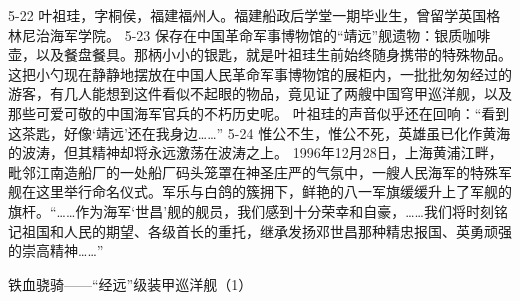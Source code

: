 \documentclass[12pt,UTF8]{ctexbook}
\begin{document}
5-22
叶祖珪，字桐侯，福建福州人。福建船政后学堂一期毕业生，曾留学英国格林尼治海军学院。
5-23
保存在中国革命军事博物馆的“靖远”舰遗物：银质咖啡壶，以及餐盘餐具。那柄小小的银匙，就是叶祖珪生前始终随身携带的特殊物品。
这把小勺现在静静地摆放在中国人民革命军事博物馆的展柜内，一批批匆匆经过的游客，有几人能想到这件看似不起眼的物品，竟见证了两艘中国穹甲巡洋舰，以及那些可爱可敬的中国海军官兵的不朽历史呢。
叶祖珪的声音似乎还在回响：“看到这茶匙，好像‘靖远’还在我身边……”
5-24
惟公不生，惟公不死，英雄虽已化作黄海的波涛，但其精神却将永远激荡在波涛之上。
1996年12月28日，上海黄浦江畔，毗邻江南造船厂的一处船厂码头笼罩在神圣庄严的气氛中，一艘人民海军的特殊军舰在这里举行命名仪式。军乐与白鸽的簇拥下，鲜艳的八一军旗缓缓升上了军舰的旗杆。“……作为海军‘世昌’舰的舰员，我们感到十分荣幸和自豪，……我们将时刻铭记祖国和人民的期望、各级首长的重托，继承发扬邓世昌那种精忠报国、英勇顽强的崇高精神……”




铁血骁骑——“经远”级装甲巡洋舰（1）
\end{document}
